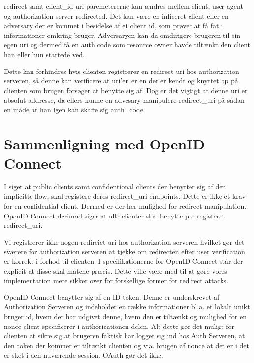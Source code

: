 \documentclass[a4paper,12pt]{article}
\theoremstyle{plain}
\theoremstyle{nonumberplain}
\begin{document}
redirect samt client\_id uri paremetererne kan ændres mellem client, user agent og authorization server redirected. Det kan være en inficeret client eller en adversary der er kommet i besidelse af et client id, som prøver at få fat i informationer omkring bruger. Adversaryen kan da omdirigere brugeren til sin egen uri og dermed få en auth code som resource owner havde tiltænkt den client han eller hun startede ved.

 Dette kan forhindres hvis clienten registrerer en redirect uri hos authorization serveren, så denne kan verificere at uri'en er en der er kendt og knyttet op på clienten som brugen forsøger at benytte sig af. Dog er det vigtigt at denne uri er absolut addresse, da ellers kunne en advesary manipulere redirect\_uri på sådan en måde at han igen kan skaffe sig auth\_code.


\section*{Sammenligning med OpenID Connect}
I \cite[section 3.1.2.2]{rfc6749} siger at public clients samt confidentional clients der benytter sig af den implicitte flow, skal registere deres redirect\_uri endpoints. Dette er ikke et krav for en confidential client. Dermed er der her mulighed for redirect manipulation. OpenID Connect derimod siger at alle clienter skal benytte pre registeret redirect\_uri.

Vi registrerer ikke nogen redireict uri hos authorization serveren hvilket gør det sværere for authorization serveren at tjekke om redirecten efter user verification er korrekt i forhod til clienten. I specifikationerne for OpenID Connect står der explicit at disse skal matche præcis.
Dette ville være med til at gøre vores implementation mere sikker over for forskellige former for redirect attacks.

OpenID Connect benytter sig af en ID token. Denne er underskrevet af Authorization Serveren og indeholder en række informationer bl.a. et lokalt unikt bruger id, hvem der har udgivet denne, hvem den er tiltænkt og mulighed for en nonce client specificerer i authorizationen delen. Alt dette gør det muligt for clienten at sikre sig at brugeren faktisk har logget sig ind hos Auth Serveren, at den token der kommer er tiltænkt clienten og via. brugen af nonce at det er i det er sket i den nuværende session. OAuth gør det ikke.
\end{document}
